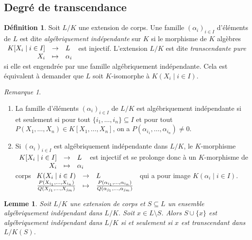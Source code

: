 \documentclass{article}
\newcommand{\applic}[4]{\begin{array}[t]{rcl}
#1 & \to & #2 \\
#3 & \mapsto & #4
\end{array}}
\theoremstyle{plain}
\newtheorem{lemma}[theorem]{Lemme}
\theoremstyle{definition}
\newtheorem{definition}[theorem]{Définition}
\theoremstyle{remark}
\newtheorem*{remark}{Remarque}
\begin{document}
\subsection{Degré de transcendance}

\begin{definition}
    Soit $L/K$ une extension de corps. Une famille $(\alpha_i)_{i\in I}$ d'éléments de $L$ est dite \emph{algébriquement indépendante} sur $K$ si le morphisme de $K$ algèbres $\applic{K[X_i \mid i\in I]}{L}{X_i}{\alpha_i}$ est injectif. L'extension $L/K$ est dite \emph{transcendante pure} si elle est engendrée par une famille algébriquement indépendante. Cela est équivalent à demander que $L$ soit $K$-isomorphe à $K(X_i \mid i\in I)$.
\end{definition}

\begin{remark} \leavevmode
    \begin{enumerate}
        \item La famille d'éléments $(\alpha_i)_{i\in I}$ de $L/K$ est algébriquement indépendante si et seulement si pour tout $\{i_1,\dots,i_n\} \subseteq I$ et pour tout $P(X_1,\dots,X_n) \in K[X_1,\dots,X_n]$, on a $P(\alpha_{i_1},\dots,\alpha_{i_n}) \ne 0$.
        \item Si $(\alpha_i)_{i\in I}$ est algébriquement indépendante dans $L/K$, le $K$-morphisme $\applic{K[X_i \mid i\in I]}{L}{X_i}{\alpha_i}$ est injectif et se prolonge donc à un $K$-morphisme de corps $\applic{K(X_i \mid i\in I)}{L}{\frac{P(X_{i_1}, \dots,X_{i_n})}{Q(X_{j_1},\dots,X_{j_m})}}{\frac{P(\alpha_{i_1}, \dots,\alpha_{i_n})}{Q(\alpha_{j_1},\dots,\alpha_{j_m})}}$ qui a pour image $K(\alpha_i \mid i \in I)$.
    \end{enumerate}
\end{remark}

\begin{lemma} \label{lemalgind}
    Soit $L/K$ une extension de corps et $S\subseteq L$ un ensemble algébriquement indépendant dans $L/K$. Soit $x \in L\setminus S$. Alors $S \cup \{x\}$ est algébriquement indépendant dans $L/K$ si et seulement si $x$ est transcendant dans $L/K(S)$.
\end{lemma}
\end{document}
